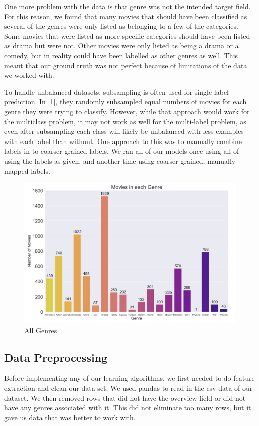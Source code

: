 \documentclass[sigconf]{acmart}
\begin{document}
One more problem with the data is that genre was not the intended target field.  For this reason, we found that many movies that should have been classified as several of the genres were only listed as belonging to a few of the categories.  Some movies that were listed as more specific categories should have been listed as drama but were not. Other movies were only listed as being a drama or a comedy, but in reality could have been labelled as other genres as well.  This meant that our ground truth was not perfect because of limitations of the data we worked with. 

To handle unbalanced datasets, subsampling is often used for single label prediction.  In [1], they randomly subsampled equal numbers of movies for each genre they were trying to classify.  However, while that approach would work for the multiclass problem, it may not work as well for the multi-label problem, as even after subsampling each class will likely be unbalanced with less examples with each label than without. One approach to this was to manually combine labels in to coarser grained labels.  We ran all of our models once using all of using the labels as given, and another time using coarser grained, manually mapped labels. 

\begin{figure}
	\includegraphics[width=\linewidth]{all_genres.png}
	\caption{All Genres}
	\label{fig:all}
\end{figure}


\subsection{Data Preprocessing}
Before implementing any of our learning algorithms, we first needed to do feature extraction and clean our data set.  We used pandas to read in the csv data of our dataset.  We then removed rows that did not have the overview field or did not have any genres associated with it.  This did not eliminate too many rows, but it gave us data that was better to work with.
\end{document}

